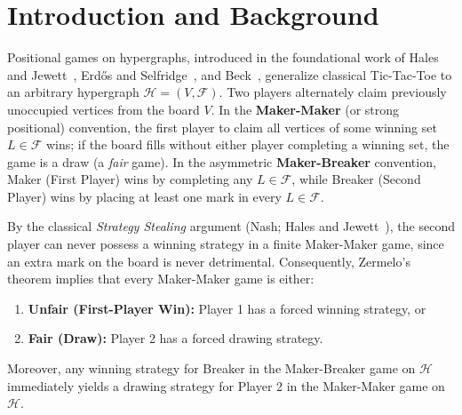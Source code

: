 \documentclass[11pt,a4paper]{article}
\theoremstyle{definition}
\theoremstyle{remark}
\begin{document}
\begin{abstract}
Finally, using a $24$-thread C++20 $128$-bit bitboard engine with $O_h$ ($48$-fold) symmetry canonicalization, we compute the exact unpruned canonical Directed Acyclic Graph (DAG) through ply $8$ ($1,159,667$ states vs.\ $4.74 \times 10^{16}$ raw branches, a $4.09 \times 10^{10}\times$ reduction) and ply $12$ on the coupled center opening ($16,218,865$ states, a $4.72 \times 10^{15}\times$ reduction), and demonstrate $100\%$ ridge extinction across all $10$ opening orbits by rounds $43$--$45$ with over $6.6 \times 10^6$ formal Hopcroft--Karp and Erd\H{o}s--Selfridge draw certificates. We conclude by isolating the exact analytical bridge required to convert these results into an unconditional proof without beam truncation.
\end{abstract}

\tableofcontents

\section{Introduction and Background}

Positional games on hypergraphs, introduced in the foundational work of Hales and Jewett~\cite{HalesJewett1963}, Erd\H{o}s and Selfridge~\cite{ErdosSelfridge1973}, and Beck~\cite{Beck1982,Beck2008}, generalize classical Tic-Tac-Toe to an arbitrary hypergraph $\mathcal{H} = (V, \mathcal{F})$. Two players alternately claim previously unoccupied vertices from the board $V$. In the \textbf{Maker-Maker} (or strong positional) convention, the first player to claim all vertices of some winning set $L \in \mathcal{F}$ wins; if the board fills without either player completing a winning set, the game is a draw (a \emph{fair} game). In the asymmetric \textbf{Maker-Breaker} convention, Maker (First Player) wins by completing any $L \in \mathcal{F}$, while Breaker (Second Player) wins by placing at least one mark in every $L \in \mathcal{F}$.

By the classical \emph{Strategy Stealing} argument (Nash; Hales and Jewett~\cite{HalesJewett1963}), the second player can never possess a winning strategy in a finite Maker-Maker game, since an extra mark on the board is never detrimental. Consequently, Zermelo's theorem implies that every Maker-Maker game is either:
\begin{enumerate}[noitemsep]
    \item \textbf{Unfair (First-Player Win):} Player 1 has a forced winning strategy, or
    \item \textbf{Fair (Draw):} Player 2 has a forced drawing strategy.
\end{enumerate}
Moreover, any winning strategy for Breaker in the Maker-Breaker game on $\mathcal{H}$ immediately yields a drawing strategy for Player 2 in the Maker-Maker game on $\mathcal{H}$.
\end{document}
